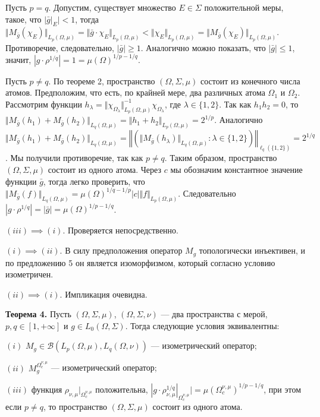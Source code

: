 \documentclass[11pt,twoside]{article}
\begin{document}
Пусть $p=q$. Допустим, существует множество $E\in\Sigma$ положительной меры, такое, что $|\bar{g}|_E|<1$, тогда $\Vert M_{\bar{g}}(\chi_E)\Vert_{L_p(\Omega,\mu)}
=\Vert \bar{g}\cdot\chi_E\Vert_{L_p(\Omega,\mu)}
<\Vert\chi_E\Vert_{L_p(\Omega,\mu)}
=\Vert M_{\bar{g}}(\chi_E)\Vert_{L_p(\Omega,\mu)}$.
Противоречие, следовательно, $|\bar{g}|\geq 1$. Аналогично можно показать, что $|\bar{g}|\leq 1$, значит, $|g\cdot\rho^{1/q}|=1=\mu(\Omega)^{1/p-1/q}$. 

Пусть $p\neq q$. По теореме 2, пространство $(\Omega,\Sigma,\mu)$ состоит из конечного числа атомов. Предположим, что есть, по крайней мере, два различных атома $\Omega_1$ и $\Omega_2$. Рассмотрим функции $h_\lambda=\Vert\chi_{\Omega_\lambda}\Vert_{L_p(\Omega,\mu)}^{-1}\chi_{\Omega_\lambda}$, где $\lambda\in\{1,2\}$. Так как $h_1h_2=0$, то $
\Vert M_{\bar{g}}(h_1)+M_{\bar{g}}(h_2)\Vert_{L_q(\Omega,\mu)}
=\Vert h_1+h_2\Vert_{L_p(\Omega,\mu)}
=2^{1/p}$. Аналогично $
\Vert M_{\bar{g}}(h_1)+M_{\bar{g}}(h_2)\Vert_{L_q(\Omega,\mu)}
=\left\Vert\left(\Vert M_{\bar{g}}(h_\lambda)\Vert_{L_q(\Omega,\mu)}:\lambda\in\{1,2\}\right)\right\Vert_{\ell_q(\{1,2\})}
=2^{1/q}$. Мы получили противоречие, так как $p\neq q$. Таким образом, пространство $(\Omega,\Sigma,\mu)$ состоит из одного атома. Через $c$ мы обозначим константное значение функции $\bar{g}$, тогда легко проверить, что $\Vert M_{\bar{g}}(f)\Vert_{L_q(\Omega,\mu)}
=\mu(\Omega)^{1/q-1/p}|c|\Vert f\Vert_{L_p(\Omega,\mu)}$. Следовательно $|g\cdot\rho^{1/q}|=|\bar{g}|=\mu(\Omega)^{1/p-1/q}$.

$(iii)$$\implies$$ (i)$. Проверяется непосредственно.

$(i)$$\implies$$ (ii)$. В силу предположения оператор $M_g$ топологически инъективен, и по предложению 5 он является изоморфизмом, который согласно условию изометричен.

$(ii)$$\implies$$ (i)$. Импликация очевидна.


\textbf{Теорема 4.} Пусть $(\Omega,\Sigma,\mu)$, $(\Omega,\Sigma,\nu)$ --- два пространства с мерой, $p,q\in[1,+\infty]$ и $g\in L_0(\Omega,\Sigma)$. Тогда следующие условия эквивалентны:

$(i)$ $M_g\in\mathcal{B}(L_p(\Omega,\mu),L_q(\Omega,\nu))$ --- изометрический оператор; 

$(ii)$ $M_g^{\Omega_c^{\nu,\mu}}$ --- изометрический оператор;

$(iii)$ функция $\rho_{\nu,\mu}|_{\Omega_c^{\nu,\mu}}$ положительна, $|g\cdot \rho_{\nu,\mu}^{1/q}|_{\Omega_c^{\nu,\mu}}|=\mu(\Omega_c^{\nu,\mu})^{1/p-1/q}$, при этом если $p\neq q$, то пространство $(\Omega,\Sigma,\mu)$ состоит из одного атома.
\end{document}
